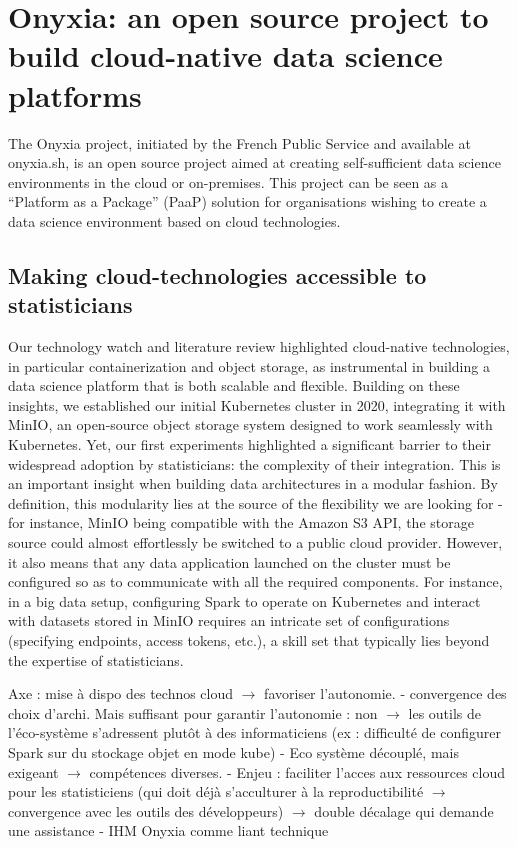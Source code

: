\section{Onyxia: an open source project to build cloud-native data science platforms}



The Onyxia project, initiated by the French Public Service and available at
onyxia.sh, is an open source project aimed at creating self-sufficient data science environments in the cloud or on-premises. This project can be seen as a “Platform as a Package” (PaaP) solution for organisations wishing to create a data science environment based on cloud technologies.

\subsection{Making cloud-technologies accessible to statisticians}

Our technology watch and literature review highlighted cloud-native technologies, in particular containerization and object storage, as instrumental in building a data science platform that is both scalable and flexible. Building on these insights, we established our initial Kubernetes cluster in 2020, integrating it with MinIO, an open-source object storage system designed to work seamlessly with Kubernetes. Yet, our first experiments highlighted a significant barrier to their widespread adoption by statisticians: the complexity of their integration. This is an important insight when building data architectures in a modular fashion. By definition, this modularity lies at the source of the flexibility we are looking for - for instance, MinIO being compatible with the Amazon S3 API, the storage source could almost effortlessly be switched to a public cloud provider. However, it also means that any data application launched on the cluster must be configured so as to communicate with all the required components. For instance, in a big data setup, configuring Spark to operate on Kubernetes and interact with datasets stored in MinIO requires an intricate set of configurations (specifying endpoints, access tokens, etc.), a skill set that typically lies beyond the expertise of statisticians.



Axe : mise à dispo des technos cloud $\rightarrow$ favoriser l'autonomie.
- convergence des choix d'archi. Mais suffisant pour garantir l'autonomie : non $\rightarrow$ les outils de l'éco-système s'adressent plutôt à des informaticiens (ex : difficulté de configurer Spark sur du stockage objet en mode kube)
- Eco système découplé, mais exigeant $\rightarrow$ compétences diverses.
- Enjeu : faciliter l'acces aux ressources cloud pour les statisticiens (qui doit déjà s'acculturer à la reproductibilité $\rightarrow$ convergence avec les outils des développeurs) $\rightarrow$ double décalage qui demande une assistance
- IHM Onyxia comme liant technique


